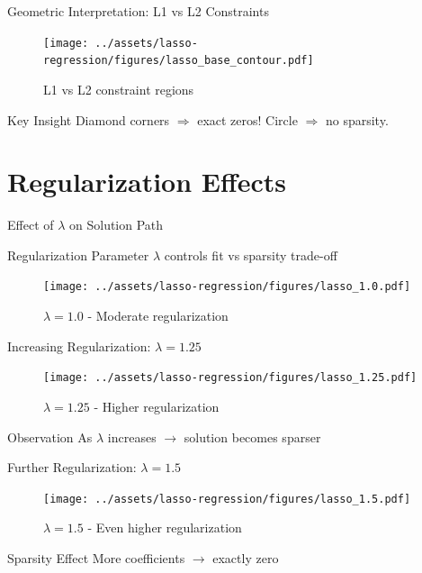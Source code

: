 \documentclass{beamer}
\begin{document}
\begin{frame}{Geometric Interpretation: L1 vs L2 Constraints}
\begin{figure}
    \centering
    \texttt{[image: ../assets/lasso-regression/figures/lasso\_base\_contour.pdf]}
    \caption{{\footnotesize L1 vs L2 constraint regions}}
    \label{fig:my_label}
\end{figure}

\begin{keypointsbox}{Key Insight}
{\footnotesize
Diamond corners $\Rightarrow$ exact zeros! Circle $\Rightarrow$ no sparsity.
}
\end{keypointsbox}
\end{frame}

\section{Regularization Effects}

\begin{frame}{Effect of $\lambda$ on Solution Path}
\begin{alertbox}{Regularization Parameter}
$\lambda$ controls fit vs sparsity trade-off
\end{alertbox}

\begin{figure}
\texttt{[image: ../assets/lasso-regression/figures/lasso\_1.0.pdf]}
\caption{{\footnotesize $\lambda = 1.0$ - Moderate regularization}}
\end{figure}
\end{frame}

\begin{frame}{Increasing Regularization: $\lambda = 1.25$}
\begin{figure}\texttt{[image: ../assets/lasso-regression/figures/lasso\_1.25.pdf]}\caption{{\footnotesize $\lambda = 1.25$ - Higher regularization}}
\end{figure}

\begin{keypointsbox}{Observation}
As $\lambda$ increases $\rightarrow$ solution becomes sparser
\end{keypointsbox}
\end{frame}

\begin{frame}{Further Regularization: $\lambda = 1.5$}
\begin{figure}\texttt{[image: ../assets/lasso-regression/figures/lasso\_1.5.pdf]}\caption{{\footnotesize $\lambda = 1.5$ - Even higher regularization}}
\end{figure}

\begin{alertbox}{Sparsity Effect}
More coefficients $\rightarrow$ exactly zero
\end{alertbox}
\end{frame}
\end{document}
